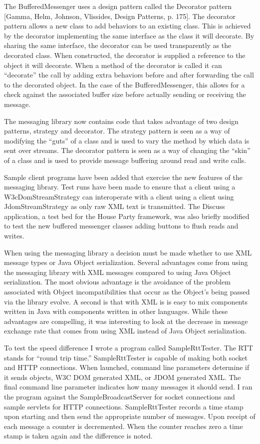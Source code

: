 \documentclass{article}
\begin{document}
The BufferedMessenger uses a design pattern called the Decorator pattern
[Gamma, Helm, Johnson, Vlissides, Design Patterns, p. 175].  The decorator
pattern allows a new class to add behaviors to an existing class.  This is
achieved by the decorator implementing the same interface as the class it will
decorate.  By sharing the same interface, the decorator can be used
transparently as the decorated class.  When constructed, the decorator is
supplied a reference to the object it will decorate.  When a method of the
decorator is called it can ``decorate'' the call by adding extra behaviors
before and after forwarding the call to the decorated object.  In the case of
the BufferedMessenger, this allows for a check against the associated buffer
size before actually sending or receiving the message.

The messaging library now contains code that takes advantage of two
design patterns, strategy and decorator.  The strategy pattern is seen
as a way of modifying the ``guts'' of a class and is used to vary the
method by which data is sent over streams.  The decorator pattern is
seen as a way of changing the ``skin'' of a class and is used to
provide message buffering around read and write calls.

Sample client programs have been added that exercise the new features
of the messaging library.  Test runs have been made to ensure that a
client using a W3cDomStreamStrategy can interoperate with a client
using a client using JdomStreamStrategy as only raw XML text is
transmitted.  The Discuss application, a test bed for the House Party
framework, was also briefly modified to test the new buffered
messenger classes adding buttons to flush reads and writes.

When using the messaging library a decision must be made whether to use XML
message types or Java Object serialization.  Several advantages come from using
the messaging library with XML messages compared to using Java Object
serialization.  The most obvious advantage is the avoidance of the problem
associated with Object incompatibilities that  occur as the Object's being
passed via the library evolve.  A second is that with XML is is easy to mix
components written in Java with components written in other languages.  While
these advantages are compelling, it was interesting to look at the decrease in
message exchange rate that comes from using XML instead of Java Object
serialization.

To test the speed difference I wrote a program called SampleRttTester.  The
RTT stands for ``round trip time.''  SampleRttTester is capable of making both
socket and HTTP connections.  When launched, command line parameters determine
if it sends objects, W3C DOM generated XML, or JDOM generated XML.  The final
command line parameter indicates how many messages it should send.  I ran the
program against the SampleBroadcastServer for socket connections and sample
servlets for HTTP connections.  SampleRttTester records a time stamp upon
starting and then send the appropriate number of messages.  Upon receipt of
each message a counter is decremented.  When the counter reaches zero a time
stamp is taken again and the difference is noted.
\end{document}

